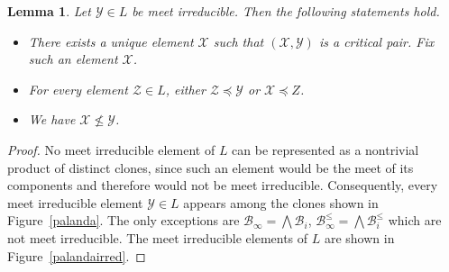 \documentclass{amsart}
\numberwithin{equation}{section}
\theoremstyle{plain}
\newtheorem{lemma}[theorem]{Lemma}
\theoremstyle{definition}
\def\clone#1{\mathcal{#1}}
\def\Bc{\clone{B}}
\begin{document}
\begin{lemma}
\label{allineq}
  Let $\clone{Y}\in L$ be meet irreducible. Then the following statements hold.
\begin{itemize}
\item There exists a unique element $\clone{X}$ such that $(\clone{X},\clone{Y})$ is a critical pair. Fix such an element $\clone{X}$.
\item For every element $\clone{Z}\in L$, either $\clone{Z}\preceq \clone{Y}$ or $\clone{X}\preceq Z$.
\item We have $\clone{X}\not\leq \clone{Y}$.
\end{itemize}
\end{lemma}
\begin{proof} 
No meet irreducible element of $L$ can be represented as a nontrivial product of distinct clones, since such an element would be the meet of its components and therefore would not be meet irreducible.
 Consequently, every meet irreducible element $\clone{Y}\in L$ appears among the clones shown in Figure~\ref{palanda}.
 The only exceptions are
$\Bc_\infty = \bigwedge \Bc_i$, $\Bc_\infty^\leq = \bigwedge \Bc_i^\leq$ which are not meet irreducible. The meet irreducible elements of $L$ are shown in Figure~\ref{palandairred}.


\end{proof}
\end{document}
